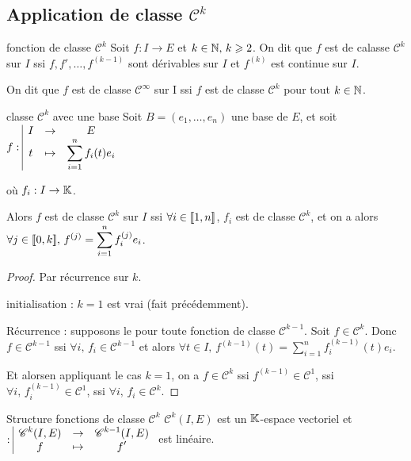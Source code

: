 \subsection{Application de classe \texorpdfstring{$\mathscr C^k$}{Ck}}

\begin{definition}{fonction de classe $\mathscr C^k$}{}
    Soit $f : I \to E$ et $k \in \mathbb{N}, \, k \geqslant 2$. On dit que $f$ est de calasse 
    $\mathscr C^k$ sur $I$ ssi $f, f', \ldots, f^{(k-1)}$ sont dérivables sur $I$ et $f^{(k)}$ est continue sur $I$.

    On dit que $f$ est de classe $\mathscr C^\infty$ sur I ssi $f$ est de classe 
    $\mathscr C^k$ pour tout $k \in \mathbb{N}$.
\end{definition}

\begin{proposition}{classe $\mathscr C^k$ avec une base }{}
    Soit $B = (e_1, \ldots, e_n)$ une base de $E$, et soit
    $f: \space \begin{array}{|ccc} \displaystyle I & \to & \displaystyle E \\ \displaystyle t & \mapsto & \displaystyle \sum_{i=1}^n f_i(t)e_i \end{array}$ 
    
    où $f_i : I \to \mathbb{K}$.

    Alors $f$ est de classe $\mathscr C^k$ sur $I$ ssi $\forall i \in [\![1, n]\!]$, $f_i$ est de classe $\mathscr C^k$, 
    et on a alors $\displaystyle \forall j \in [\![0, k]\!], \, f^{(j)} = \sum_{i=1}^n f_i^{(j)}e_i$.
\end{proposition}


\begin{proof}
    Par récurrence sur $k$. 

    initialisation : $k = 1$ est vrai (fait précédemment).

    Récurrence : supposons le pour toute fonction de classe $\mathscr C^{k - 1} $. Soit 
    $f \in \mathscr C^k$. Donc $f \in \mathscr C^{k-1}$ ssi $\forall i, \, f_i \in \mathscr C^{k-1}$ 
    et alors $\displaystyle \forall t \in I, \, f^{(k-1)}(t) = \sum_{i=1}^n f_i^{(k-1)}(t)e_i$.

    Et alorsen appliquant le cas $k = 1$, on a $f \in \mathscr C^k$ ssi $f^{(k-1)} \in \mathscr C^1$, 
    ssi $\forall i, \, f_i^{(k-1)} \in \mathscr C^1$, ssi $\forall i, \, f_i \in \mathscr C^k$.
\end{proof}

\begin{proposition}{Structure fonctions de classe $\mathscr C^k$}{}
    $\mathscr C^k(I, E)$ est un $\mathbb{K}$-espace vectoriel et
    $: \space \begin{array}{|ccc} \displaystyle \mathscr C^k(I, E) & \to & \displaystyle \mathscr C^{k-1}(I, E) \\ \displaystyle f & \mapsto & \displaystyle f' \end{array}$ est linéaire.
\end{proposition}

